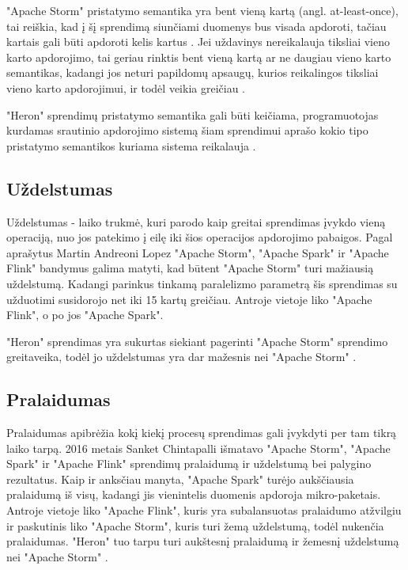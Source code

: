 \documentclass{VUMIFPSbakalaurinis}
\begin{document}
"Apache Storm" pristatymo semantika yra bent vieną kartą (angl. at-least-once), tai reiškia, kad į šį sprendimą siunčiami duomenys bus visada apdoroti, tačiau kartais gali būti apdoroti kelis kartus \cite{prithi20}. Jei uždavinys nereikalauja tiksliai vieno karto apdorojimo, tai geriau rinktis bent vieną kartą ar ne daugiau vieno karto semantikas, kadangi jos neturi papildomų apsaugų, kurios reikalingos tiksliai vieno karto apdorojimui, ir todėl veikia greičiau \cite{zhang20}. \par

"Heron" sprendimų pristatymo semantika gali būti keičiama, programuotojas kurdamas srautinio apdorojimo sistemą šiam sprendimui aprašo kokio tipo pristatymo semantikos kuriama sistema reikalauja \cite{delivery-semantics}.

\subsection{Uždelstumas}

Uždelstumas - laiko trukmė, kuri parodo kaip greitai sprendimas įvykdo vieną operaciją, nuo jos patekimo į eilę iki šios operacijos apdorojimo pabaigos. Pagal \cite{Lopez2016APC} aprašytus Martin Andreoni Lopez "Apache Storm", "Apache Spark" ir "Apache Flink" bandymus galima matyti, kad būtent "Apache Storm" turi mažiausią uždelstumą. Kadangi parinkus tinkamą paralelizmo parametrą šis sprendimas su užduotimi susidorojo net iki 15 kartų greičiau. Antroje vietoje liko "Apache Flink", o po jos "Apache Spark". \par

"Heron" sprendimas yra sukurtas siekiant pagerinti "Apache Storm" sprendimo greitaveika, todėl jo uždelstumas yra dar mažesnis nei "Apache Storm" \cite{Kulkarni:2015:THS:2723372.2742788}.

\subsection{Pralaidumas}

Pralaidumas apibrėžia kokį kiekį procesų sprendimas gali įvykdyti per tam tikrą laiko tarpą. 2016 metais Sanket Chintapalli išmatavo "Apache Storm", "Apache Spark" ir "Apache Flink" sprendimų pralaidumą ir uždelstumą bei palygino rezultatus. Kaip ir anksčiau manyta, "Apache Spark" turėjo aukščiausia pralaidumą iš visų, kadangi jis vienintelis duomenis apdoroja mikro-paketais\cite{chintapalli2016benchmarking}. Antroje vietoje liko "Apache Flink", kuris yra subalansuotas pralaidumo atžvilgiu ir paskutinis liko "Apache Storm", kuris turi žemą uždelstumą, todėl nukenčia pralaidumas. "Heron" tuo tarpu turi aukštesnį pralaidumą ir žemesnį uždelstumą nei "Apache Storm" \cite{TwitterHeron}. 
\end{document}
